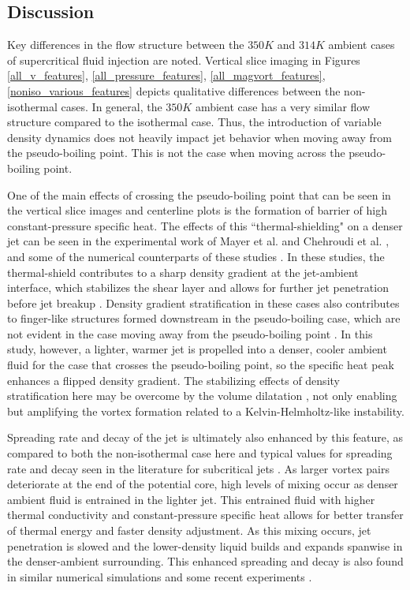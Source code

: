 \subsection{Discussion}
Key differences in the flow structure between the $350 K$ and $314 K$ ambient cases of supercritical fluid injection are noted. Vertical slice imaging in Figures \ref{all_v_features}, \ref{all_pressure_features}, \ref{all_magvort_features}, \ref{noniso_various_features} depicts qualitative differences between the non-isothermal cases. In general, the $350 K$ ambient case has a very similar flow structure compared to the isothermal case. Thus, the introduction of variable density dynamics does not heavily impact jet behavior when moving away from the pseudo-boiling point. This is not the case when moving across the pseudo-boiling point. 

One of the main effects of crossing the pseudo-boiling point that can be seen in the vertical slice images and centerline plots is the formation of barrier of high constant-pressure specific heat. The effects of this ``thermal-shielding" \cite{10.1063/1.5054797} on a denser jet can be seen in the experimental work of Mayer et al. \cite{mayer2003raman} and Chehroudi et al. \cite{}, and some of the numerical counterparts of these studies \cite{10.1063/1.5054797, doi:10.1063/1.1795011}. In these studies, the thermal-shield contributes to a sharp density gradient at the jet-ambient interface, which stabilizes the shear layer and allows for further jet penetration before jet breakup \cite{10.1063/1.5054797}. Density gradient stratification in these cases also contributes to finger-like structures formed downstream in the pseudo-boiling case, which are not evident in the case moving away from the pseudo-boiling point \cite{10.1063/1.5054797}. In this study, however, a lighter, warmer jet is propelled into a denser, cooler ambient fluid for the case that crosses the pseudo-boiling point, so the specific heat peak enhances a flipped density gradient. The stabilizing effects of density stratification here may be overcome by the volume dilatation \cite{Li2012}, not only enabling but amplifying the vortex formation related to a Kelvin-Helmholtz-like instability. 

Spreading rate and decay of the jet is ultimately also enhanced by this feature, as compared to both the non-isothermal case here and typical values for spreading rate and decay seen in the literature for subcritical jets \cite{iso_comp_1_ref_1}. As larger vortex pairs deteriorate at the end of the potential core, high levels of mixing occur as denser ambient fluid is entrained in the lighter jet. This entrained fluid with higher thermal conductivity and constant-pressure specific heat allows for better transfer of thermal energy and faster density adjustment. As this mixing occurs, jet penetration is slowed and the lower-density liquid builds and expands spanwise in the denser-ambient surrounding. This enhanced spreading and decay is also found in similar numerical simulations \cite{Li2012} and some recent experiments \cite{10.1063/5.0072291}.

